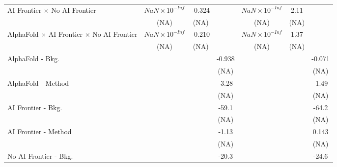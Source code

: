 \begin{tabular}{lcccccc}
   AI Frontier $\times$ No AI Frontier                                        & $NaN\times 10^{-Inf}$  & -0.324 &        & $NaN\times 10^{-Inf}$  & 2.11  &   \\   
                                                                              & (NA)                   & (NA)   &        & (NA)                   & (NA)  &   \\   
   AlphaFold $\times$ AI Frontier $\times$ No AI Frontier                     & $NaN\times 10^{-Inf}$  & -0.210 &        & $NaN\times 10^{-Inf}$  & 1.37  &   \\   
                                                                              & (NA)                   & (NA)   &        & (NA)                   & (NA)  &   \\   
   AlphaFold - Bkg.                                                           &                        &        & -0.938 &                        &       & -0.071\\   
                                                                              &                        &        & (NA)   &                        &       & (NA)\\   
   AlphaFold - Method                                                         &                        &        & -3.28  &                        &       & -1.49\\   
                                                                              &                        &        & (NA)   &                        &       & (NA)\\   
   AI Frontier - Bkg.                                                         &                        &        & -59.1  &                        &       & -64.2\\   
                                                                              &                        &        & (NA)   &                        &       & (NA)\\   
   AI Frontier - Method                                                       &                        &        & -1.13  &                        &       & 0.143\\   
                                                                              &                        &        & (NA)   &                        &       & (NA)\\   
   No AI Frontier - Bkg.                                                      &                        &        & -20.3  &                        &       & -24.6\\   

\end{tabular}
